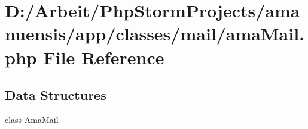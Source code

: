 \hypertarget{ama_mail_8php}{}\section{D\+:/\+Arbeit/\+Php\+Storm\+Projects/amanuensis/app/classes/mail/ama\+Mail.php File Reference}
\label{ama_mail_8php}
\subsection*{Data Structures}
\begin{DoxyCompactItemize}
\item 
class \hyperlink{class_ama_mail}{Ama\+Mail}
\end{DoxyCompactItemize}
